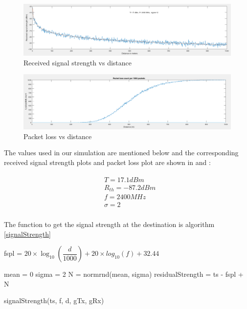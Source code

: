 \begin{figure}[hbtp]
\centering
\includegraphics[width=1\textwidth]{ncsuthesis-0.6/Chapter-4/figs/signal_strength}
\caption{Received signal strength vs distance}
\label{fig:signal_strength}
\end{figure}
\begin{figure}[hbtp]
\centering
\includegraphics[width=1\textwidth]{ncsuthesis-0.6/Chapter-4/figs/packet_loss}
\caption{Packet loss vs distance}
\label{fig:packet_loss}
\end{figure}
The values used in our simulation are mentioned below and the corresponding received signal strength plots and packet loss plot are shown in  and :

\begin{eqnarray*}
\begin{aligned}
    & T = 17.1  dBm \\
    & R_{th} = -87.2 dBm \\ 
    & f = 2400 MHz \\
    & \sigma = 2 \\
\end{aligned}
\end{eqnarray*}

The function to get the signal strength at the destination is algorithm \ref{signalStrength}

\begin{algorithm}
\DontPrintSemicolon
\SetAlgoLined
{}
fspl = $ 20 \times \log_{10}(\dfrac{d}{1000}) + 20 \times log_{10}(f) + 32.44 $\;

mean = 0\;
sigma = 2\;
N = normrnd(mean, sigma)\;
residualStrength = ts - fspl + N\;
\caption{signalStrength(ts, f, d, gTx, gRx)} \label{signalStrength}
\end{algorithm}    

